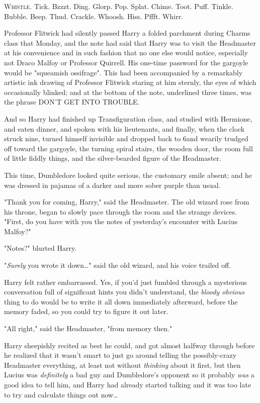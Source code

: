
\lettrine{W}{histle}. Tick. 
Bzzzt. Ding. Glorp. Pop. Splat. Chime. Toot. Puff. Tinkle. Bubble. Beep. Thud. 
Crackle. Whoosh. Hiss. Pffft. Whirr.

Professor Flitwick had silently passed Harry a folded parchment during Charms 
class that Monday, and the note had said that Harry was to visit the Headmaster 
at his convenience and in such fashion that no one else would notice, 
especially not Draco Malfoy or Professor Quirrell. His one-time password for 
the gargoyle would be "squeamish ossifrage". This had been accompanied by a 
remarkably artistic ink drawing of Professor Flitwick staring at him sternly, 
the eyes of which occasionally blinked; and at the bottom of the note, 
underlined three times, was the phrase DON'T GET INTO TROUBLE.

And so Harry had finished up Transfiguration class, and studied with Hermione, 
and eaten dinner, and spoken with his lieutenants, and finally, when the clock 
struck nine, turned himself invisible and dropped back to 6\PM and wearily 
trudged off toward the gargoyle, the turning spiral stairs, the wooden door, 
the room full of little fiddly things, and the silver-bearded figure of the 
Headmaster.

This time, Dumbledore looked quite serious, the customary smile absent; and he 
was dressed in pajamas of a darker and more sober purple than usual.

"Thank you for coming, Harry," said the Headmaster. The old wizard rose from 
his throne, began to slowly pace through the room and the strange devices. 
"First, do you have with you the notes of yesterday's encounter with Lucius 
Malfoy?"

"Notes?" blurted Harry.

"\emph{Surely} you wrote it down{\ldots}" said the old wizard, and his voice 
trailed off.

Harry felt rather embarrassed. Yes, if you'd just fumbled through a mysterious 
conversation full of significant hints you didn't understand, the \emph{bloody 
obvious} thing to do would be to write it all down immediately afterward, 
before the memory faded, so you could try to figure it out later.

"All right," said the Headmaster, "from memory then."

Harry sheepishly recited as best he could, and got almost halfway through 
before he realized that it wasn't smart to just go around telling the 
possibly-crazy Headmaster everything, at least not without \emph{thinking} 
about it first, but then Lucius was \emph{definitely} a bad guy and 
Dumbledore's opponent so it probably \emph{was} a good idea to tell him, and 
Harry had already started talking and it was too late to try and calculate 
things out now{\ldots}

